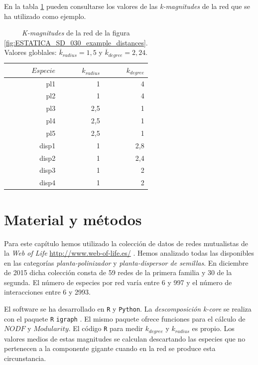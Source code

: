 En la tabla \ref{table:table_SD_030} pueden consultarse los valores de las \textit{k-magnitudes} de la red que se ha utilizado como ejemplo.

\begin{table}[htbp]
\small
  \centering
    \begin{tabular}{rrr}
    \toprule
    $Especie$ & $k_{radius}$ & $k_{degree}$  \\
    \midrule
    pl1  & 1    & 4 \\
    pl2  & 1    & 4 \\
    pl3  & 2,5  & 1 \\
    pl4  & 2,5  & 1 \\
    pl5  & 2,5  & 1 \\
    disp1 & 1    & 2,8 \\
    disp2 & 1    & 2,4 \\
    disp3 & 1    & 2 \\
    disp4 & 1    & 2 \\
    \bottomrule
    \end{tabular}%
  \caption{\label{table:table_SD_030} \textit{K-magnitudes} de la red de la figura \ref{fig:ESTATICA_SD_030_example_distances}. Valores globlales: $\overline k_{radius} = 1,5 $ y $\overline k_{degree} = 2,24$.}
\end{table}%

\section{Material y métodos}

Para este capítulo hemos utilizado la colección de datos de redes mutualistas de la \textit{Web of Life}  \url{http://www.web-of-life.es/} \cite{fortuna2014web}. Hemos analizado todas las disponibles en las categorías \textit{planta-polinizador} y \textit{planta-dispersor de semillas}. En diciembre de 2015 dicha colección consta de 59 redes de la primera familia y 30 de la segunda. El número de especies por red varía entre 6 y 997 y el número de interacciones entre 6 y 2993.

El software se ha desarrollado en \texttt{R} y \texttt{Python}. La \textit{descomposición k-core} se realiza con el paquete \texttt{R} \texttt{igraph} \cite{csardi2006igraph}. El mismo paquete ofrece funciones para el cálculo de $NODF$ y $Modularity$. El código \texttt{R} para medir ${k}_{degree}$ y ${k}_{radius}$ es propio. Los valores medios de estas magnitudes se calculan descartando las especies que no pertenecen a la componente gigante cuando en la red se produce esta circunstancia. 

